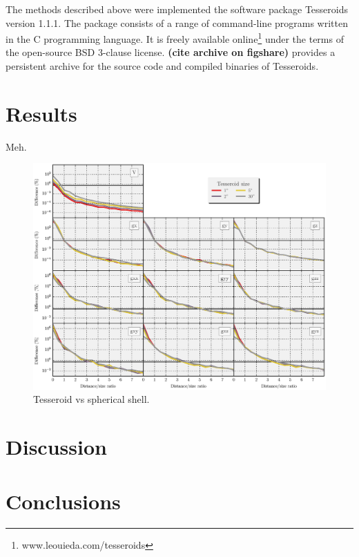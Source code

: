 \documentclass[extra]{gji}
\begin{document}
The methods described above
were implemented the software package
Tesseroids version 1.1.1.
The package consists
of a range of command-line programs
written in the C programming language.
It is freely available
online\footnote{www.leouieda.com/tesseroids}
under the terms of
the open-source BSD 3-clause license.
\textbf{(cite archive on figshare)} provides a persistent
archive for the source code and compiled binaries of Tesseroids.


\section{Results}

Meh.

\begin{figure}
    \centering
    \includegraphics[width=\textwidth]{figs/tesseroid-x-shell}
    \caption{
        Tesseroid vs spherical shell.
    }
    \label{fig:tesseroid-x-shell}
\end{figure}

\section{Discussion}

\section{Conclusions}
\end{document}
